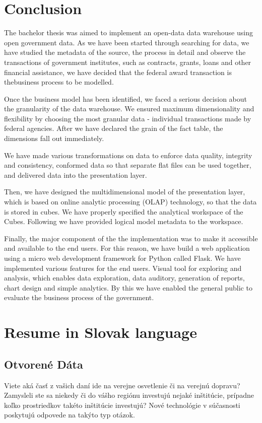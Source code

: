 \documentclass[letterpaper,12pt,oneside]{sphinxmanual}
\begin{document}
\chapter{Conclusion}
\label{conclusion::doc}\label{conclusion:conclusion}
The bachelor thesis was aimed to implement an open-data data warehouse using open government data.
As we have been started through searching for data, we have studied the metadata of the source, the
process in detail and observe the transactions of government institutes, such as contracts, grants,
loans and other financial assistance, we have decided that the federal award transaction is thebusiness process to be modelled.

Once the business model has been identified, we faced a serious decision about the granularity of the data warehouse.
We ensured maximum dimensionality and flexibility by choosing the most granular data - individual transactions made by federal agencies.
After we have declared the grain of the fact table, the dimensions fall out immediately.

We have made various transformations on data to enforce data quality, integrity and consistency, conformed data so
that separate flat files can be used together, and delivered data into the presentation layer.

Then, we have designed the multidimensional model of the presentation layer, which is based on online analytic processing
(OLAP) technology, so that the data is stored in cubes. We have properly specified the analytical workspace of the Cubes.
Following we have provided logical model metadata to the workspace.

Finally, the major component of the the implementation was to make it accessible and available to the end users.
For this reason, we have build a web application using a micro web development framework for Python called Flask.
We have implemented various features for the end users. Visual tool for exploring and analysis, which enables data
exploration, data auditory, generation of reports, chart design and simple analytics. By this we have enabled the
general public to evaluate the business process of the government.


\chapter{Resume in Slovak language}
\label{resume::doc}\label{resume:resume-in-slovak-language}

\section{Otvorené Dáta}
\label{resume:otvorene-data}
Viete aká časť z vašich daní ide na verejne osvetlenie či na verejnú dopravu? Zamysleli ste sa
niekedy či do vášho regiónu investujú nejaké inštitúcie, prípadne koľko prostriedkov takéto inštitúcie
investujú? Nové technológie v súčasnosti poskytujú odpovede na takýto typ otázok.
\end{document}
